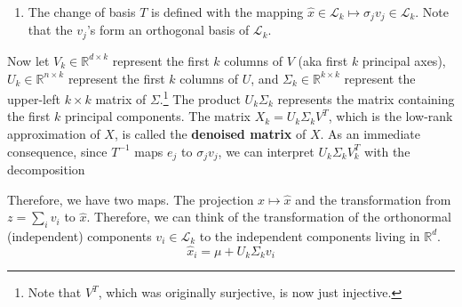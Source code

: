 \begin{theorem}
\begin{enumerate}
      \item The change of basis $T$ is defined with the mapping $\hat{x} \in \mathcal{L}_k \mapsto \sigma_j v_j \in \mathcal{L}_k$. Note that the $v_j$'s form an orthogonal basis of $\mathcal{L}_k$. 
      \end{enumerate} 
      Now let $V_k \in \mathbb{R}^{d \times k}$ represent the first $k$ columns of $V$ (aka first $k$ principal axes), $U_k \in \mathbb{R}^{n \times k}$ represent the first $k$ columns of $U$, and $\Sigma_k \in \mathbb{R}^{k \times k}$ represent the upper-left $k \times k$ matrix of $\Sigma$.\footnote{Note that $V^T$, which was originally surjective, is now just injective.} The product $U_k \Sigma_k$ represents the matrix containing the first $k$ principal components. The matrix $X_k = U_k \Sigma_k V^T$, which is the low-rank approximation of $X$, is called the \textbf{denoised matrix} of $X$. As an immediate consequence, since $T^{-1}$ maps $e_j$ to $\sigma_j v_j$, we can interpret $U_k \Sigma_k V_k^T$ with the decomposition 
      \begin{center}
      \end{center}

      Therefore, we have two maps. The projection $x \mapsto \hat{x}$ and the transformation from $z = \sum_i v_i$ to $\hat{x}$. Therefore, we can think of the transformation of the orthonormal (independent) components $v_i \in \mathcal{L}_k$ to the independent components living in $\mathbb{R}^d$. 
      \begin{equation}
        \hat{x}_i = \mu + U_k \Sigma_k v_i 
      \end{equation}
    \end{theorem}

